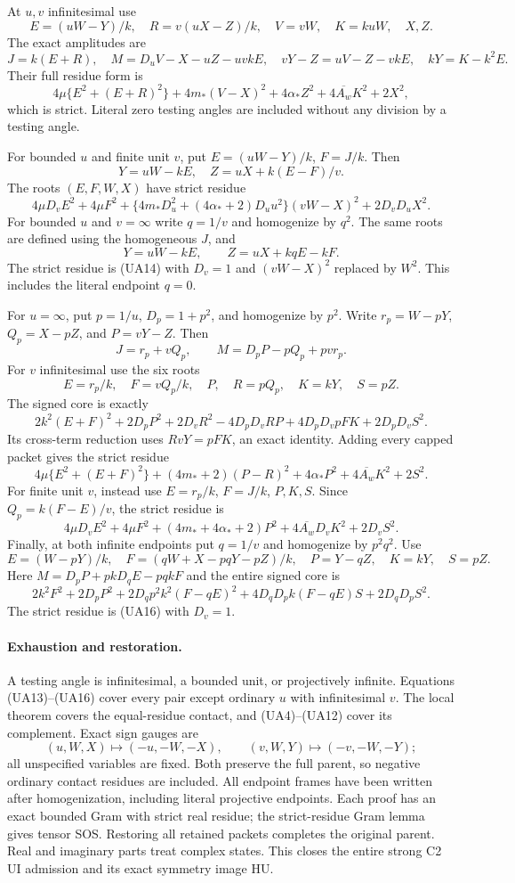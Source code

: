 At $u,v$ infinitesimal use
\[
 E=(uW-Y)/k,\quad R=v(uX-Z)/k,\quad V=vW,\quad K=kuW,
 \quad X,Z.
\]
The exact amplitudes are
\[
 J=k(E+R),\quad M=D_uV-X-uZ-uvkE,\quad
 vY-Z=uV-Z-vkE,\quad kY=K-k^2E.
\]
Their full residue form is
\[
 4\mu\{E^2+(E+R)^2\}+4m_*(V-X)^2+4\alpha_*Z^2
       +4\overline{A_w}K^2+2X^2,                    \tag{UA13}
\]
which is strict. Literal zero testing angles are included without
any division by a testing angle.

For bounded $u$ and finite unit $v$, put
$E=(uW-Y)/k$, $F=J/k$. Then
\[
 Y=uW-kE,\quad Z=uX+k(E-F)/v.
\]
The roots $(E,F,W,X)$ have strict residue
\[
 4\mu D_vE^2+4\mu F^2+
 \{4m_*D_u^2+(4\alpha_*+2)D_uu^2\}(vW-X)^2
 +2D_vD_uX^2.                                      \tag{UA14}
\]
For bounded $u$ and $v=\infty$ write $q=1/v$ and homogenize by $q^2$.
The same roots are defined using the homogeneous $J$, and
\[
 Y=uW-kE,\qquad Z=uX+kqE-kF.
\]
The strict residue is (UA14) with $D_v=1$ and $(vW-X)^2$ replaced
by $W^2$. This includes the literal endpoint $q=0$.

For $u=\infty$, put $p=1/u$, $D_p=1+p^2$, and homogenize by $p^2$.
Write $r_p=W-pY$, $Q_p=X-pZ$, and $P=vY-Z$. Then
\[
 J=r_p+vQ_p,\qquad M=D_pP-pQ_p+pv r_p.
\]
For $v$ infinitesimal use the six roots
\[
 E=r_p/k,\quad F=vQ_p/k,\quad P,\quad R=pQ_p,
 \quad K=kY,\quad S=pZ.
\]
The signed core is exactly
\[
 2k^2(E+F)^2+2D_pP^2+2D_vR^2-4D_pD_vRP
    +4D_pD_vpFK+2D_pD_vS^2.
\]
Its cross-term reduction uses $RvY=pFK$, an exact identity.
Adding every capped packet gives the strict residue
\[
 4\mu\{E^2+(E+F)^2\}+(4m_*+2)(P-R)^2
 +4\alpha_*P^2+4\overline{A_w}K^2+2S^2.             \tag{UA15}
\]
For finite unit $v$, instead use $E=r_p/k$, $F=J/k$, $P,K,S$.
Since $Q_p=k(F-E)/v$, the strict residue is
\[
 4\mu D_vE^2+4\mu F^2+(4m_*+4\alpha_*+2)P^2
 +4\overline{A_w}D_vK^2+2D_vS^2.                   \tag{UA16}
\]
Finally, at both infinite endpoints put $q=1/v$ and homogenize by
$p^2q^2$. Use
\[
 E=(W-pY)/k,\quad F=(qW+X-pqY-pZ)/k,\quad
 P=Y-qZ,\quad K=kY,\quad S=pZ.
\]
Here $M=D_pP+pkD_qE-pqkF$ and the entire signed core is
\[
 2k^2F^2+2D_pP^2+2D_qp^2k^2(F-qE)^2
 +4D_qD_pk(F-qE)S+2D_qD_pS^2.
\]
The strict residue is (UA16) with $D_v=1$.

\paragraph{Exhaustion and restoration.}
A testing angle is infinitesimal, a bounded unit, or projectively
infinite. Equations (UA13)--(UA16) cover every pair except ordinary
$u$ with infinitesimal $v$. The local theorem covers the equal-residue
contact, and (UA4)--(UA12) cover its complement. Exact sign gauges are
\[
 (u,W,X)\mapsto(-u,-W,-X),\qquad
 (v,W,Y)\mapsto(-v,-W,-Y);
\]
all unspecified variables are fixed. Both preserve the full parent,
so negative ordinary contact residues are included. All endpoint
frames have been written after homogenization, including literal
projective endpoints. Each proof has an exact bounded Gram with
strict real residue; the strict-residue Gram lemma gives tensor SOS.
Restoring all retained packets completes the original parent.
Real and imaginary parts treat complex states. This closes the
entire strong C2 UI admission and its exact symmetry image HU.

